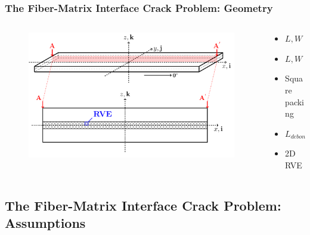 \documentclass[first,firstsupp,lastsupp,last,hyperref,table]{ETHclass}
\begin{document}
\begin{frame}
\frametitle{\small The Fiber-Matrix Interface Crack Problem: Geometry}
\vspace{-1cm}
\centering
\begin{columns}[c]
\begin{column}{0.85\textwidth}
\begin{figure}
\centering
\includegraphics[width=\columnwidth]{laminate-section.pdf}
\end{figure}
\end{column}
\begin{column}{0.15\textwidth}
\scriptsize
\begin{itemize}[label=]
\item $L, W >> t$
\item $L, W \rightarrow \infty$
\item Square packing
\item$L_{debond} >> \Delta\theta_{debond}$
\item 2D RVE
\end{itemize}
\end{column}
\end{columns}

\end{frame}

\subsection[Assumptions]{The Fiber-Matrix Interface Crack Problem: Assumptions}
\end{document}
